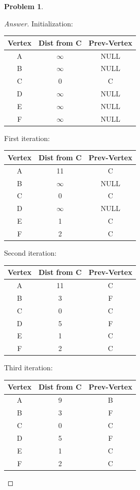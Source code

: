 \documentclass[11pt]{article}
\theoremstyle{definition}
\theoremstyle{definition}
\newtheorem{required}{Problem}
\theoremstyle{definition}
\begin{document}
\begin{required}
\begin{proof}[Answer]
Initialization:\\
\begin{center}
\begin{tabular}[c]{|c|c|c|} 
	Vertex &Dist from C &Prev-Vertex \\\hline
	A &$\infty$ & NULL\\
	B &$\infty$& NULL\\
	C &0& C\\
	D &$\infty$ & NULL\\
	E &$\infty$& NULL\\
	F &$\infty$ & NULL\\
\end{tabular}
\end{center}	
First iteration:\\
\begin{center}
\begin{tabular}[c]{|c|c|c|} 
	Vertex &Dist from C &Prev-Vertex \\\hline
	A &11 & C\\
	B & $\infty$ & NULL\\
	C &0 & C\\
	D &$\infty$  & NULL\\
	E & 1& C\\
	F &2 & C\\
\end{tabular}
\end{center}	

Second iteration:
\begin{center}
\begin{tabular}[c]{|c|c|c|} 
	Vertex &Dist from C &Prev-Vertex \\\hline
	A &11 & C\\
	B & 3 &F\\
	C &0& C\\
	D &5  & F\\
	E & 1& C\\
	F &2 & C\\
\end{tabular}
\end{center}	

Third iteration:
\begin{center}
\begin{tabular}[c]{|c|c|c|} 
	Vertex &Dist from C &Prev-Vertex \\\hline
	A &9 & B\\
	B & 3 &F\\
	C &0& C\\
	D &5  & F\\
	E & 1& C\\
	F &2 & C\\
\end{tabular}
\end{center}	


\end{proof}
\end{required}
\end{document}
